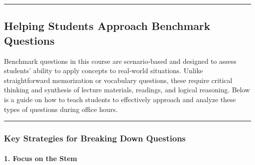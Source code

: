 \documentclass[
]{article}
\begin{document}
\begin{center}\rule{0.5\linewidth}{0.5pt}\end{center}

\hypertarget{helping-students-approach-benchmark-questions}{%
\subsection{Helping Students Approach Benchmark Questions}\label{helping-students-approach-benchmark-questions}}

Benchmark questions in this course are scenario-based and designed to assess students' ability to apply concepts to real-world situations. Unlike straightforward memorization or vocabulary questions, these require critical thinking and synthesis of lecture materials, readings, and logical reasoning. Below is a guide on how to teach students to effectively approach and analyze these types of questions during office hours.

\begin{center}\rule{0.5\linewidth}{0.5pt}\end{center}

\hypertarget{key-strategies-for-breaking-down-questions}{%
\subsubsection*{Key Strategies for Breaking Down Questions}\label{key-strategies-for-breaking-down-questions}}

\hypertarget{focus-on-the-stem}{%
\paragraph*{1. Focus on the Stem}\label{focus-on-the-stem}}
\end{document}
